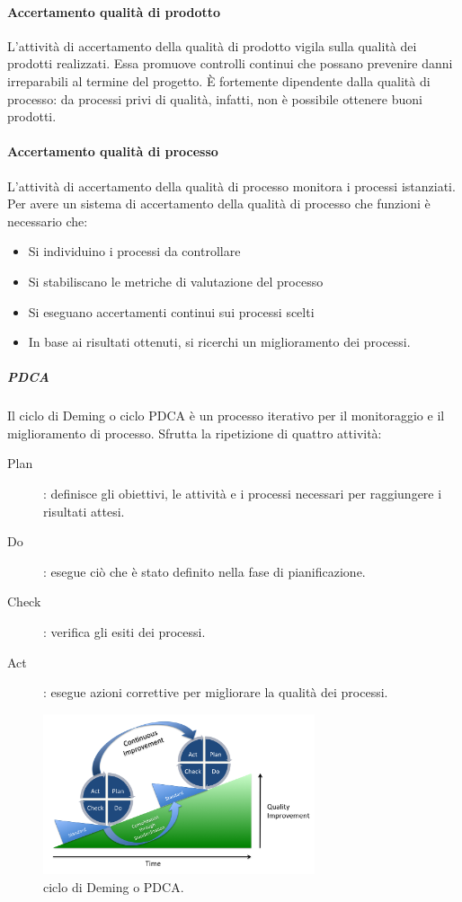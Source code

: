 \documentclass[../norme-di-progetto.tex]{subfiles}
\begin{document}
\paragraph{Accertamento qualità di prodotto}%
\label{par:accertamento_qualita_di_prodotto}
L'attività di accertamento della qualità di prodotto vigila sulla qualità dei prodotti realizzati. Essa promuove controlli continui che possano prevenire danni irreparabili al termine del progetto. È fortemente dipendente dalla qualità di processo: da processi privi di qualità, infatti, non è possibile ottenere buoni prodotti.

\paragraph{Accertamento qualità di processo}%
\label{par:accertamento_qualita_di_processo}
L'attività di accertamento della qualità di processo monitora i processi istanziati. Per avere un sistema di accertamento della qualità di processo che funzioni è necessario che:

\begin{itemize}
  \item Si individuino i processi da controllare
  \item Si stabiliscano le metriche di valutazione del processo
  \item Si eseguano accertamenti continui sui processi scelti
  \item In base ai risultati ottenuti, si ricerchi un miglioramento dei processi.
\end{itemize}

\subparagraph{PDCA}%
\label{subp:PDCA}
Il ciclo di Deming o ciclo PDCA è un processo iterativo per il monitoraggio e il miglioramento di processo. Sfrutta la ripetizione di quattro attività:

\begin{description}
  \item [Plan]: definisce gli obiettivi, le attività e i processi necessari per raggiungere i risultati attesi.
  \item [Do]: esegue ciò che è stato definito nella fase di pianificazione.
  \item [Check]: verifica gli esiti dei processi.
  \item [Act]: esegue azioni correttive per migliorare la qualità dei processi.
\end{description}
\begin{figure}[H]
  \includegraphics[width=8cm]{components/img/PDCA-process.png}
  \centering
  \caption{ciclo di Deming o PDCA.}
\end{figure}
\end{document}
